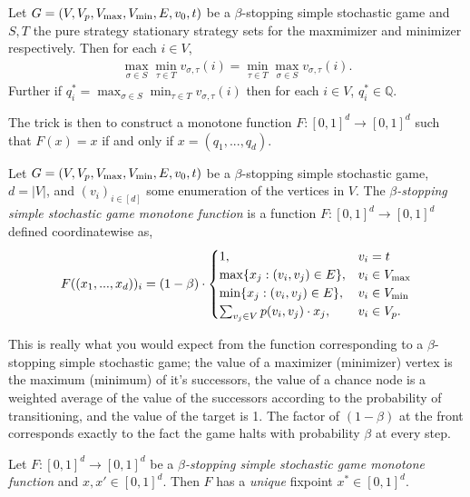 \begin{theorem} \label{ssgHasValue}
  Let $G = (V, V_p, V_{\max}, V_{\min}, E, v_0, t)$ be a $\beta$-stopping simple 
  stochastic game and $S, T$ the pure strategy stationary strategy sets
  for the maxmimizer and minimizer respectively.
  Then for each $i \in V$,
  \begin{align*}
    \max_{\sigma \in S} \min_{\tau \in T} v_{\sigma, \tau} (i) = 
  \min_{\tau \in T} \max_{\sigma \in S} v_{\sigma, \tau} (i).
  \end{align*}
  Further if $q_i^* = \max_{\sigma \in S} \min_{\tau \in T} v_{\sigma, \tau} (i)$
  then for each $i \in V$, $q_i^* \in \mathbb{Q}$.
\end{theorem}
The trick is then to construct a monotone function $F : [0, 1]^d \to [0, 1]^d$
such that $F(x) = x$ if and only if $x = (q_1, ..., q_d)$.
\begin{definition}
  Let $G = (V, V_p, V_{\max}, V_{\min}, E, v_0, t)$ be a $\beta$-stopping simple stochastic game, 
  $d = |V|$, and $(v_i)_{i \in [d]}$ some enumeration of the vertices in $V$. 
  The \emph{$\beta$-stopping simple stochastic game monotone function} is a function
  $F : [0, 1]^d \to [0, 1]^d$ defined coordinatewise as,
  \begin{align*}
    F((x_1, ..., x_d))_i = 
      \left( 1 - \beta \right) \cdot
      \begin{cases}
        1, & v_i = t \\
        \max\{x_j : (v_i, v_j) \in E\}, & v_i \in V_{\max} \\
        \min\{x_j : (v_i, v_j) \in E\}, & v_i \in V_{\min} \\
        \sum_{v_j \in V} p(v_i, v_j) \cdot x_j, & v_i \in V_p.
      \end{cases}
  \end{align*}
\end{definition}
This is really what you would expect from the function corresponding to a $\beta$-stopping
simple stochastic game; the value of a maximizer (minimizer) vertex is the maximum (minimum)
of it's successors, the value of a chance node is a weighted average of the value of the successors
according to the probability of transitioning, and the value of the target is 1. The factor
of $(1 - \beta)$ at the front corresponds exactly to the fact the game halts with probability $\beta$
at every step.
\begin{lemma}\label{ssgUnique}
  Let $F : [0, 1]^d \to [0, 1]^d$ be a \emph{$\beta$-stopping simple stochastic game monotone function} and $x, x' \in [0, 1]^d$.
  Then $F$ has a \emph{unique} fixpoint $x^* \in [0, 1]^d$.
\end{lemma}
